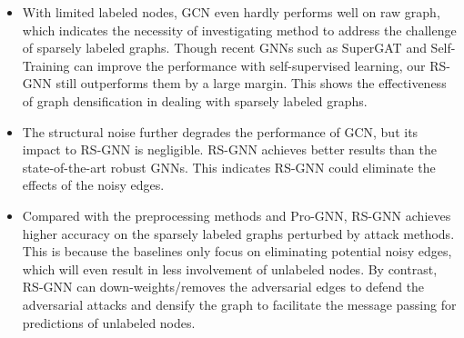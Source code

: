 \begin{itemize}[leftmargin=*]
    \item With limited labeled nodes, GCN even hardly performs well on raw graph, which indicates the necessity of investigating method to address the challenge of sparsely labeled graphs. Though recent GNNs such as SuperGAT and Self-Training can improve the performance with self-supervised learning, our RS-GNN still outperforms them by a large margin. This shows the effectiveness of graph densification in dealing with sparsely labeled graphs.
    \item The structural noise further degrades the performance of GCN, but its impact to RS-GNN is negligible. RS-GNN achieves better results than the state-of-the-art robust GNNs. This indicates RS-GNN could eliminate the effects of the noisy edges.
    \item Compared with the preprocessing methods and Pro-GNN, RS-GNN achieves higher accuracy on the sparsely labeled graphs perturbed by attack methods. 
    This is because the baselines only focus on eliminating potential noisy edges, which will even result in less involvement of unlabeled nodes. 
    By contrast, RS-GNN can down-weights/removes the adversarial edges to defend the adversarial attacks and densify the graph to facilitate the message passing for predictions of unlabeled nodes.
    
\end{itemize}



